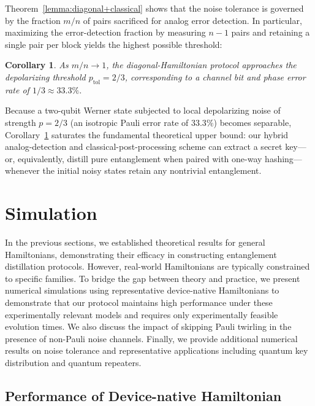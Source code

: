 \documentclass[onecolumn,prx,longbibliography,nofootinbib, superscriptaddress]{revtex4-2}
\newtheorem{corollary}{Corollary}
\theoremstyle{recap}
\begin{document}
Theorem~\ref{lemma:diagonal+classical} shows that the noise tolerance is governed by the fraction $m/n$ of pairs sacrificed for analog error detection. In particular, maximizing the error-detection fraction by measuring $n-1$ pairs and retaining a single pair per block yields the highest possible threshold:

\begin{corollary}\label{thm:tolerance}
    As $m/n\to 1$, the diagonal-Hamiltonian protocol approaches the depolarizing threshold $p_{\mathrm{tol}}=2/3$, corresponding to a channel bit and phase error rate of $1/3 \approx 33.3\%$.
\end{corollary}

Because a two-qubit Werner state subjected to local depolarizing noise of strength $p=2/3$ (an isotropic Pauli error rate of $33.3\%$) becomes separable, Corollary~\ref{thm:tolerance} saturates the fundamental theoretical upper bound: our hybrid analog-detection and classical-post-processing scheme can extract a secret key---or, equivalently, distill pure entanglement when paired with one-way hashing---whenever the initial noisy states retain any nontrivial entanglement.

\section{Simulation}\label{sec:simulation}

In the previous sections, we established theoretical results for general Hamiltonians, demonstrating their efficacy in constructing entanglement distillation protocols. However, real-world Hamiltonians are typically constrained to specific families. To bridge the gap between theory and practice, we present numerical simulations using representative device-native Hamiltonians to demonstrate that our protocol maintains high performance under these experimentally relevant models and requires only experimentally feasible evolution times. We also discuss the impact of skipping Pauli twirling in the presence of non-Pauli noise channels. Finally, we provide additional numerical results on noise tolerance and representative applications including quantum key distribution and quantum repeaters.

\subsection{Performance of Device-native Hamiltonian}
\end{document}

